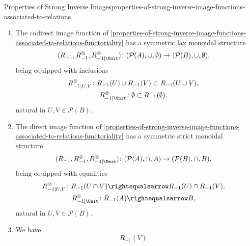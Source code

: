 \begin{proposition}{Properties of Strong Inverse Images}{properties-of-strong-inverse-image-functions-associated-to-relations}
\begin{enumerate}
            natural in $U,V\in\mathcal{P}(B)$.
        \item\label{properties-of-strong-inverse-image-functions-associated-to-relations-symmetric-lax-monoidality-with-respect-to-unions}The codirect image function of \cref{properties-of-strong-inverse-image-functions-associated-to-relations-functoriality} has a symmetric lax monoidal structure
            \[
                (R_{-1},R^{\otimes}_{-1},R^{\otimes}_{-1|\Unit})
                \colon
                (\mathcal{P}(A),\cup,\emptyset)
                \to
                (\mathcal{P}(B),\cup,\emptyset),
            \]%
            being equipped with inclusions%
            \[
                \begin{gathered}
                    R^{\otimes}_{-1|U,V}   \colon R_{-1}(U)\cup R_{-1}(V) \subset R_{-1}(U\cup V),\\
                    R^{\otimes}_{-1|\Unit} \colon \emptyset               \subset R_{-1}(\emptyset),
                \end{gathered}
            \]%
            natural in $U,V\in\mathcal{P}(B)$.
        \item\label{properties-of-strong-inverse-image-functions-associated-to-relations-symmetric-strict-monoidality-with-respect-to-intersections}The direct image function of \cref{properties-of-strong-inverse-image-functions-associated-to-relations-functoriality} has a symmetric strict monoidal structure
            \[
                (R_{-1},R^{\otimes}_{-1},R^{\otimes}_{-1|\Unit})
                \colon
                (\mathcal{P}(A),\cap,A)
                \to
                (\mathcal{P}(B),\cap,B),
            \]%
            being equipped with equalities%
            \[
                \begin{gathered}
                    R^{\otimes}_{-1|U,V}   \colon R_{-1}(U\cap V) \rightequalsarrow R_{-1}(U)\cap R_{-1}(V),\\
                    R^{\otimes}_{-1|\Unit} \colon R_{-1}(A)       \rightequalsarrow B,
                \end{gathered}
            \]%
            natural in $U,V\in\mathcal{P}(B)$.
        \item\label{properties-of-strong-inverse-image-functions-associated-to-relations-interaction-with-weak-inverse-images-1}We have
            \[
                R_{-1}(V)%
\]
\end{enumerate}
\end{proposition}
